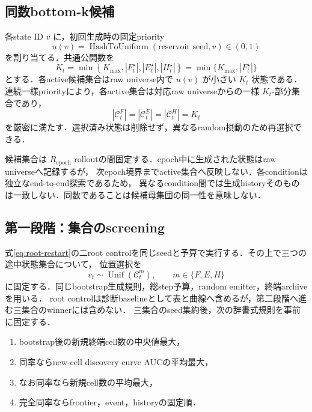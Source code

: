 \documentclass[a4paper,11pt]{ltjsarticle}
\begin{document}
\subsection{同数bottom-k候補}

各state ID \(v\) に，初回生成時の固定priority
\begin{equation}
  u(v)=\operatorname{HashToUniform}(\text{reservoir seed},v)\in(0,1)
\end{equation}
を割り当てる．共通公開数を
\begin{equation}
  K_t=\min\left\{
  K_{\max},|F_t^\star|,|E_t^\star|,|H_t^\star|
  \right\}
  =\min\{K_{\max},|F_t^\star|\}
  \label{eq:common-k}
\end{equation}
とする．各active候補集合はraw universe内で \(u(v)\) が小さい \(K_t\) 状態である．
連続一様priorityにより，各active集合は対応raw universeからの一様 \(K_t\)-部分集合であり，
\begin{equation}
  |\mathcal C_t^F|=|\mathcal C_t^E|=|\mathcal C_t^H|=K_t
\end{equation}
を厳密に満たす．選択済み状態は削除せず，異なるrandom摂動のため再選択できる．

候補集合は \(R_{\mathrm{epoch}}\) rolloutの間固定する．epoch中に生成された状態はraw universeへ記録するが，
次epoch境界までactive集合へ反映しない．各conditionは独立なend-to-end探索であるため，
異なるcondition間では生成historyそのものは一致しない．同数であることは候補母集団の同一性を意味しない．

\subsection{第一段階：集合のscreening}

式\eqref{eq:root-restart}の二root controlを同じseedと予算で実行する．その上で三つの途中状態集合について，
位置選択を
\begin{equation}
  v_t\sim\operatorname{Unif}(\mathcal C_t^m),
  \qquad m\in\{F,E,H\}
\end{equation}
に固定する．同じbootstrap生成規則，総step予算，random emitter，終端archiveを用いる．
root controlは診断baselineとして表と曲線へ含めるが，第二段階へ進む三集合のwinnerには含めない．
三集合のseed集約後，次の辞書式規則を事前に固定する．
\begin{enumerate}
  \item bootstrap後の新規終端cell数の中央値最大，
  \item 同率ならnew-cell discovery curve AUCの平均最大，
  \item なお同率なら新規cell数の平均最大，
  \item 完全同率ならfrontier，event，historyの固定順．
\end{enumerate}
\end{document}
